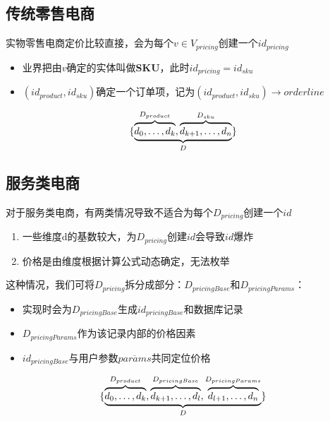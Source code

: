 \documentclass[a4paper]{article}
\begin{document}
\subsection{传统零售电商}
实物零售电商定价比较直接，会为每个$v \in V_{pricing}$创建一个$id_{pricing}$
\begin{itemize}
    \item 业界把由$v$确定的实体叫做\textbf{SKU}，此时$id_{pricing}=id_{sku}$
    \item $(id_{product}, id_{sku})$确定一个订单项，记为$(id_{product}, id_{sku}) \longrightarrow orderline$
\end{itemize}
\begin{equation}
    \{\underbrace{%
        \overbrace{\mathstrut d_0,\ldots,d_k}^{D_{product}},
        \overbrace{\mathstrut d_{k+1},\ldots,d_n}^{D_{sku}}}
    _{D} \}
\end{equation}
        
\subsection{服务类电商}
对于服务类电商，有两类情况导致不适合为每个$D_{pricing}$创建一个$id$
\begin{enumerate}
    \item 一些维度d的基数较大，为$D_{pricing}$创建$id$会导致$id$爆炸
    \item 价格是由维度根据计算公式动态确定，无法枚举
\end{enumerate}
这种情况，我们可将$D_{pricing}$拆分成部分：$D_{pricingBase}$和$D_{pricingParams}$：
\begin{itemize}
    \item 实现时会为$D_{pricingBase}$生成$id_{pricingBase}$和数据库记录
    \item $D_{pricingParams}$作为该记录内部的价格因素
    \item $id_{pricingBase}$与用户参数$\overline{params}$共同定位价格
\end{itemize}
\begin{equation}
    \{\underbrace{%
        \overbrace{\mathstrut d_0,\ldots,d_k}^{D_{product}},
        \overbrace{\mathstrut d_{k+1},\ldots,d_l}^{D_{pricingBase}},
        \overbrace{\mathstrut d_{l+1},\ldots,d_n}^{D_{pricingParams}}
    }
    _{D} \}
\end{equation}
\end{document}
